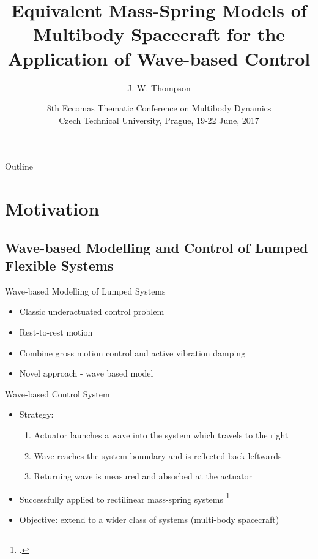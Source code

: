 \documentclass{beamer}
\title[Equivalent Mass-Spring Models]{Equivalent Mass-Spring Models of Multibody Spacecraft for the Application of Wave-based Control}
\author{J. W. Thompson} %
\institute[UCD]{University College Dublin}
\date[ECCOMAS MBD 2017] %
{8th Eccomas Thematic Conference on Multibody Dynamics \\ \vspace{8pt} \small{Czech Technical University, Prague, 19-22 June, 2017}}
\begin{document}
\begin{frame}
  \titlepage
\end{frame}
\begin{frame}{Outline}
  \tableofcontents
\end{frame}

\section{Motivation}

\subsection{Wave-based Modelling and Control of Lumped Flexible Systems}

\begin{frame}{Wave-based Modelling of Lumped Systems}
\begin{itemize}
\item Classic underactuated control problem
\item Rest-to-rest motion
\item Combine gross motion control and active vibration damping
\item Novel approach - wave based model
\end{itemize}
\end{frame}

\begin{frame}{Wave-based Control System}

\vspace{0.5cm}
\begin{itemize}
\item Strategy:
	\begin{enumerate} %
	\item Actuator launches a wave into the system which travels to the right 
	\item Wave reaches the system boundary and is reflected back leftwards
	\item Returning wave is measured and absorbed at the actuator
	\end{enumerate}
\item Successfully applied to rectilinear mass-spring systems \footcite{OConnor1998,OConnor2011}
\item Objective: extend to a wider class of systems (multi-body spacecraft)
\end{itemize}
\end{frame}
\end{document}
